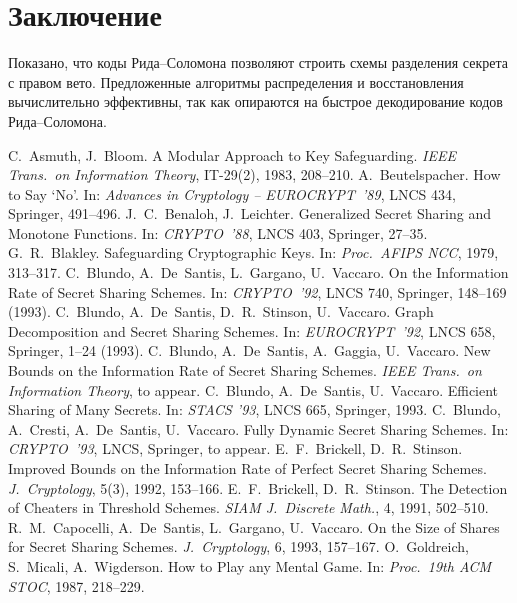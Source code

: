 \documentclass[a4paper,12pt]{article}
\begin{document}
\section{Заключение}

Показано, что коды Рида–Соломона позволяют строить схемы разделения секрета с правом вето. Предложенные алгоритмы распределения и восстановления вычислительно эффективны, так как опираются на быстрое декодирование кодов Рида–Соломона.

\begin{thebibliography}{29}
 C.~Asmuth, J.~Bloom. A Modular Approach to Key Safeguarding. \textit{IEEE Trans.\ on Information Theory}, IT-29(2), 1983, 208--210.
 A.~Beutelspacher. How to Say `No'. In: \textit{Advances in Cryptology -- EUROCRYPT~'89}, LNCS 434, Springer, 491--496.
 J.~C.~Benaloh, J.~Leichter. Generalized Secret Sharing and Monotone Functions. In: \textit{CRYPTO~'88}, LNCS 403, Springer, 27--35.
 G.~R.~Blakley. Safeguarding Cryptographic Keys. In: \textit{Proc.\ AFIPS NCC}, 1979, 313--317.
 C.~Blundo, A.~De~Santis, L.~Gargano, U.~Vaccaro. On the Information Rate of Secret Sharing Schemes. In: \textit{CRYPTO~'92}, LNCS 740, Springer, 148--169 (1993).
 C.~Blundo, A.~De~Santis, D.~R.~Stinson, U.~Vaccaro. Graph Decomposition and Secret Sharing Schemes. In: \textit{EUROCRYPT~'92}, LNCS 658, Springer, 1--24 (1993).
 C.~Blundo, A.~De~Santis, A.~Gaggia, U.~Vaccaro. New Bounds on the Information Rate of Secret Sharing Schemes. \textit{IEEE Trans.\ on Information Theory}, to appear.
 C.~Blundo, A.~De~Santis, U.~Vaccaro. Efficient Sharing of Many Secrets. In: \textit{STACS '93}, LNCS 665, Springer, 1993.
 C.~Blundo, A.~Cresti, A.~De~Santis, U.~Vaccaro. Fully Dynamic Secret Sharing Schemes. In: \textit{CRYPTO~'93}, LNCS, Springer, to appear.
 E.~F.~Brickell, D.~R.~Stinson. Improved Bounds on the Information Rate of Perfect Secret Sharing Schemes. \textit{J.~Cryptology}, 5(3), 1992, 153--166.
 E.~F.~Brickell, D.~R.~Stinson. The Detection of Cheaters in Threshold Schemes. \textit{SIAM J.\ Discrete Math.}, 4, 1991, 502--510.
 R.~M.~Capocelli, A.~De~Santis, L.~Gargano, U.~Vaccaro. On the Size of Shares for Secret Sharing Schemes. \textit{J.~Cryptology}, 6, 1993, 157--167.
 O.~Goldreich, S.~Micali, A.~Wigderson. How to Play any Mental Game. In: \textit{Proc.\ 19th ACM STOC}, 1987, 218--229.

\end{thebibliography}
\end{document}
